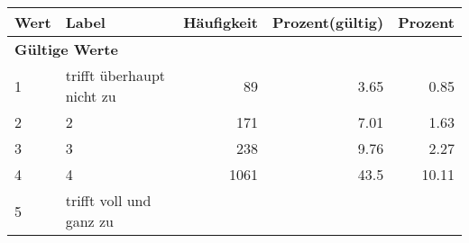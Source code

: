      \begin{longtable}{lXrrr}
     \toprule
     \textbf{Wert} & \textbf{Label} & \textbf{Häufigkeit} & \textbf{Prozent(gültig)} & \textbf{Prozent} \\
     \endhead
     \midrule
     \multicolumn{5}{l}{\textbf{Gültige Werte}}\\

     1 &
     \multicolumn{1}{X}{ trifft überhaupt nicht zu   } &


       \num{89} &
       \num[round-mode=places,round-precision=2]{3,65} &
         \num[round-mode=places,round-precision=2]{0,85} \\

     2 &
     \multicolumn{1}{X}{ 2   } &


       \num{171} &
       \num[round-mode=places,round-precision=2]{7,01} &
         \num[round-mode=places,round-precision=2]{1,63} \\

     3 &
     \multicolumn{1}{X}{ 3   } &


       \num{238} &
       \num[round-mode=places,round-precision=2]{9,76} &
         \num[round-mode=places,round-precision=2]{2,27} \\

     4 &
     \multicolumn{1}{X}{ 4   } &


       \num{1061} &
       \num[round-mode=places,round-precision=2]{43,5} &
         \num[round-mode=places,round-precision=2]{10,11} \\

     5 &
     \multicolumn{1}{X}{ trifft voll und ganz zu   } &



\end{longtable}
